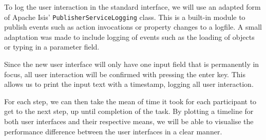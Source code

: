 To log the user interaction in the standard interface, we will use an adapted form of Apache Isis' \texttt{PublisherServiceLogging} class. This is a built-in module to publish events such as action invocations or property changes to a logfile. A small adaptation was made to include logging of events such as the loading of objects or typing in a parameter field.

Since the new user interface will only have one input field that is permanently in focus, all user interaction will be confirmed with pressing the enter key. This allows us to print the input text with a timestamp, logging all user interaction.

For each step, we can then take the mean of time it took for each participant to get to the next step, up until completion of the task. By plotting a timeline for both user interfaces and their respective means, we will be able to visualise the performance difference between the user interfaces in a clear manner.